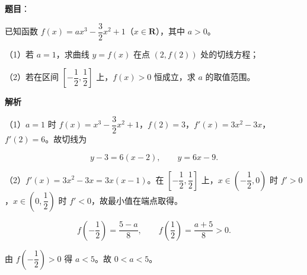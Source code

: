 \begin{answer}

\textbf{题目}：

已知函数 $f(x)=ax^3-\dfrac32x^2+1$（$x\in\mathbf R$），其中 $a>0$。

（1）若 $a=1$，求曲线 $y=f(x)$ 在点 $(2,f(2))$ 处的切线方程；

（2）若在区间 $\left[-\dfrac12,\dfrac12\right]$ 上，$f(x)>0$ 恒成立，求 $a$ 的取值范围。

\textbf{解析}

（1）$a=1$ 时 $f(x)=x^3-\dfrac32x^2+1$，$f(2)=3$，$f'(x)=3x^2-3x$，$f'(2)=6$。故切线为

\nopagebreak[4]
\[y-3=6(x-2),\qquad y=6x-9.\]

（2）$f'(x)=3x^2-3x=3x(x-1)$。在 $\left[-\dfrac12,\dfrac12\right]$ 上，$x\in\left(-\dfrac12,0\right)$ 时 $f'>0$，$x\in\left(0,\dfrac12\right)$ 时 $f'<0$，故最小值在端点取得。

\nopagebreak[4]
\[f\left(-\frac12\right)=\frac{5-a}8,\qquad
f\left(\frac12\right)=\frac{a+5}8>0.\]

由 $f\left(-\dfrac12\right)>0$ 得 $a<5$。故 $0<a<5$。


\end{answer}
